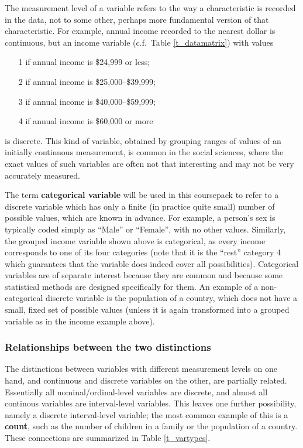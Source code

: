 The measurement level of a variable refers to the way a characteristic
is recorded in the data, not to some other, perhaps more fundamental
version of that characteristic. For example, annual income
recorded to the nearest dollar is continuous, but an income variable
(c.f.\ Table \ref{t_datamatrix}) with values
\begin{itemize}
\item[1]
if annual income is \$24,999 or less;
\item[2]
if annual income is \$25,000--\$39,999;
\item[3]
if annual income is
\$40,000--\$59,999;
\item[4]
if annual income is
\$60,000 or more
\end{itemize}
\label{p_incomegr}
is discrete. This kind of variable, obtained by grouping ranges of
values of an initially continuous measurement, is common in the
social sciences, where the exact values of such variables are often not
that interesting and may not be very accurately measured.

The term \textbf{categorical variable} will be used in this coursepack
to refer to a discrete variable which has only a finite (in practice
quite small) number of possible values, which are known in advance. For
example, a person's sex is typically coded simply as
``Male'' or ``Female'', with no other values. Similarly, the
grouped income variable shown above is categorical, as every income
corresponds to one of its four categories (note that it is the ``rest''
category 4 which guarantees that the variable does indeed cover all
possibilities). Categorical variables are of separate interest because
they are common and because some statistical methods are designed
specifically for them.
An example of a non-categorical discrete
variable is the population of a country, which does not have a small,
fixed set of possible values (unless it is again transformed into
a grouped variable as in the income example above).

\subsubsection{Relationships between the two distinctions}
\label{sss_intro_def_vars_rels}

The distinctions between variables with different measurement levels on
one hand, and continuous and discrete variables on the other, are
partially related. Essentially all nominal/ordinal-level variables are
discrete, and almost all continous variables are interval-level variables. This
leaves one further possibility, namely a discrete interval-level
variable; the most common example of this is a \textbf{count}, such as
the number of children in a family or the population of a country.
These connections are summarized in Table \ref{t_vartypes}.


